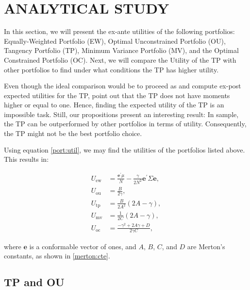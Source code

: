 \documentclass[12pt,oneside,a4paper]{memoir}
\begin{document}
\section{ANALYTICAL STUDY} \label{sec:critique}
In this section, we will present the ex-ante utilities of the following portfolios: Equally-Weighted Portfolio (EW), Optimal Unconstrained Portfolio (OU), Tangency Portfolio (TP), Minimum Variance Portfolio (MV), and the Optimal Constrained Portfolio (OC).
Next, we will compare the Utility of the TP with other portfolios to find under what conditions the TP has higher utility.

Even though the ideal comparison would be to proceed as  and compute ex-post expected utilities for the TP,  point out that the TP does not have moments higher or equal to one. Hence, finding the expected utility of the TP is an impossible task. Still, our propositions present an interesting result: In sample, the TP can be outperformed by other portfolios in terms of utility. Consequently, the TP might not be the best portfolio choice. %

Using equation \eqref{port:util}, we may find the utilities of the portfolios listed above.
This results in:

\vspace{-18 pt}
\begin{align}
	\label{u:ew}
	U_{\mathrm{ew}} &= \frac{\mathbf{e}^{\prime} \mu}{N} - \frac{\gamma}{2N^2} \mathbf{e}^{\prime}\Sigma \mathbf{e}, \\
	\label{u:ou}
	U_{\mathrm{ou}} &= \frac{B}{2\gamma},  \\
	\label{u:tp}
	U_{\mathrm{tp}} &= \frac{B}{2A^2} (2A - \gamma), \\
	\label{u:mv}
	U_{\mathrm{mv}} &= \frac{1}{2C} (2A- \gamma), \\
	\label{u:oc}
	U_{\mathrm{oc}} &= \frac{-\gamma^2 + 2A\gamma + D}{2\gamma C},
\end{align}

\noindent 
where $\mathbf{e}$ is a conformable vector of ones, and $A$, $B$, $C$, and $D$ are Merton's constants, as shown in	\eqref{merton:cte}.

\subsection*{TP and OU}
\end{document}
